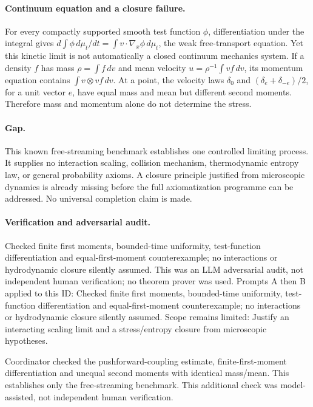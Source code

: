 \documentclass[11pt]{article}
\begin{document}
\paragraph{Continuum equation and a closure failure.}For every compactly supported smooth test function \(\phi\), differentiation under the integral gives \(d\int\phi\,d\mu_t/dt=\int v\cdot\nabla_x\phi\,d\mu_t\), the weak free-transport equation. Yet this kinetic limit is not automatically a closed continuum mechanics system. If a density \(f\) has mass \(\rho=\int f\,dv\) and mean velocity \(u=\rho^{-1}\int vf\,dv\), its momentum equation contains \(\int v\otimes vf\,dv\). At a point, the velocity laws \(\delta_0\) and \((\delta_e+\delta_{-e})/2\), for a unit vector \(e\), have equal mass and mean but different second moments. Therefore mass and momentum alone do not determine the stress.
\paragraph{Gap.}This known free-streaming benchmark establishes one controlled limiting process. It supplies no interaction scaling, collision mechanism, thermodynamic entropy law, or general probability axioms. A closure principle justified from microscopic dynamics is already missing before the full axiomatization programme can be addressed. No universal completion claim is made.

\paragraph{Verification and adversarial audit.}
Checked finite first moments, bounded-time uniformity, test-function differentiation and equal-first-moment counterexample; no interactions or hydrodynamic closure silently assumed. This was an LLM adversarial audit, not independent human verification; no theorem prover was used. Prompts A then B applied to this ID: Checked finite first moments, bounded-time uniformity, test-function differentiation and equal-first-moment counterexample; no interactions or hydrodynamic closure silently assumed. Scope remains limited: Justify an interacting scaling limit and a stress/entropy closure from microscopic hypotheses.

Coordinator checked the pushforward-coupling estimate, finite-first-moment differentiation and unequal second moments with identical mass/mean. This establishes only the free-streaming benchmark. This additional check was model-assisted, not independent human verification.
\end{document}
